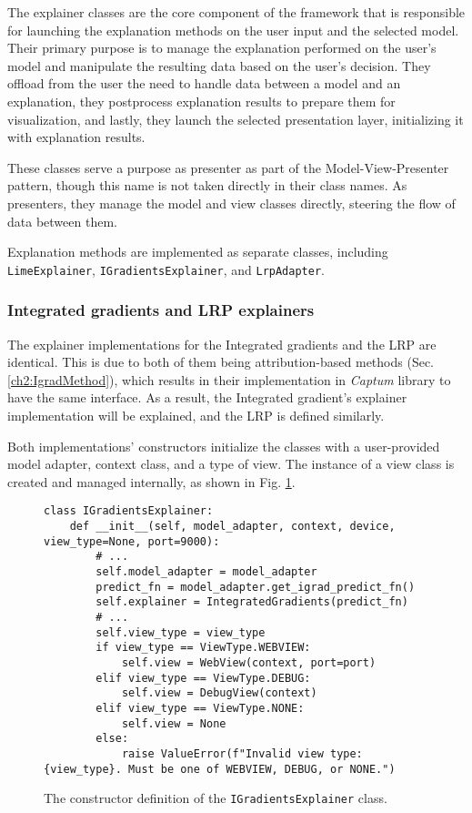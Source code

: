 \documentclass[
    bindingoffset=5mm,  %
    footnoteindent=3mm, %
    hyphenation=true    %
]{src/wut-thesis}
\begin{document}
The explainer classes are the core component of the framework that is responsible for launching
the explanation methods on the user input and the selected model. Their primary purpose is to manage
the explanation performed on the user's model and manipulate the resulting data based on the user's decision.
They offload from the user the need to handle data between a model and an explanation, they postprocess
explanation results to prepare them for visualization, and lastly,
they launch the selected presentation layer, initializing it with explanation results.  

These classes serve a purpose as presenter as part of the Model-View-Presenter pattern,
though this name is not taken directly in their class names. As presenters,
they manage the model and view classes directly, steering the flow of data between them.

Explanation methods are implemented as separate classes, including \texttt{LimeExplainer},
\texttt{IGradientsExplainer}, and \texttt{LrpAdapter}.

\subsubsection{Integrated gradients and LRP explainers}

The explainer implementations for the Integrated gradients and the LRP are identical.
This is due to both of them being attribution-based methods (Sec. \ref{ch2:IgradMethod}),
which results in their implementation in \emph{Captum} library to have the same interface.
As a result, the Integrated gradient's explainer implementation will be explained,
and the LRP is defined similarly.

Both implementations' constructors initialize the classes with a user-provided model adapter,
context class, and a type of view. The instance of a view class is created and managed internally,
as shown in Fig. \ref{fig:IGradientsExplainer}.

\begin{figure}[h!]
\begin{verbatim}
class IGradientsExplainer:
    def __init__(self, model_adapter, context, device, view_type=None, port=9000):
        # ...
        self.model_adapter = model_adapter
        predict_fn = model_adapter.get_igrad_predict_fn()
        self.explainer = IntegratedGradients(predict_fn)
        # ...
        self.view_type = view_type
        if view_type == ViewType.WEBVIEW:
            self.view = WebView(context, port=port)
        elif view_type == ViewType.DEBUG:
            self.view = DebugView(context)
        elif view_type == ViewType.NONE:
            self.view = None
        else:
            raise ValueError(f"Invalid view type: {view_type}. Must be one of WEBVIEW, DEBUG, or NONE.")
\end{verbatim}
\caption{The constructor definition of the \texttt{IGradientsExplainer} class.}
\label{fig:IGradientsExplainer}
\end{figure}
\end{document}
